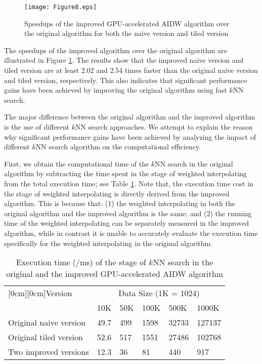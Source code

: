 \documentclass[final,5p,times,twocolumn,authoryear]{elsarticle}
\begin{document}
\begin{figure}[!h]
				\centering
				\texttt{[image: Figure8.eps]}
				\caption{Speedups of the improved GPU-accelerated AIDW algorithm 
					over the original algorithm for both the naive version and tiled version}
				\label{fig8}
			\end{figure}
			
			The speedups of the improved algorithm over the original algorithm are 
			illustrated in Figure \ref{fig8}. The results show that the improved naive version 
			and tiled version are at least 2.02 and 2.54 times faster than the original 
			naive version and tiled version, respectively. This also indicates that 
			significant performance gains have been achieved by improving the original 
			algorithm using fast $k$NN search.
			
			The major difference between the original algorithm and the improved 
			algorithm is the use of different $k$NN search approaches. We attempt to 
			explain the reason why significant performance gains have been achieved by analyzing 
			the impact of different $k$NN search algorithm on the computational efficiency. 
			
			First, we obtain the computational time of the $k$NN search in the original 
			algorithm by subtracting the time spent in the stage of weighted 
			interpolating from the total execution time; see Table \ref{tab3}. Note that, the 
			execution time cost in the stage of weighted interpolating is directly 
			derived from the improved algorithm. This is because that: (1) the weighted 
			interpolating in both the original algorithm and the improved algorithm is 
			the same; and (2) the running time of the weighted interpolating can be 
			separately measured in the improved algorithm, while in contrast it is 
			unable to accurately evaluate the execution time specifically for the 
			weighted interpolating in the original algorithm. 
			
			\begin{table}[htbp]
			\caption{Execution time (/ms) of the stage of $k$NN search in the 
							original and the improved GPU-accelerated AIDW algorithm}
				\begin{center}
					\small
					\begin{tabular}{p{90pt}p{15pt}p{15pt}p{20pt}p{20pt}p{20pt}}
						\toprule
						\raisebox{-1.50ex}[0cm][0cm]{Version}& 
						\multicolumn{5}{c}{Data Size (1K = 1024)}  \\
						\cline{2-6} 
						& 
						10K& 
						50K& 
						100K& 
						500K& 
						1000K \\
						\midrule
						Original naive version& 
						49.7& 
						499& 
						1598& 
						32733& 
						127137 \\
						Original tiled version& 
						52.6& 
						517& 
						1551& 
						27486& 
						102768 \\
						Two improved versions& 
						12.3& 
						36& 
						81& 
						440& 
						917 \\
						\bottomrule
					\end{tabular}
					\label{tab3}
				\end{center}
			\end{table}
			
\end{document}
